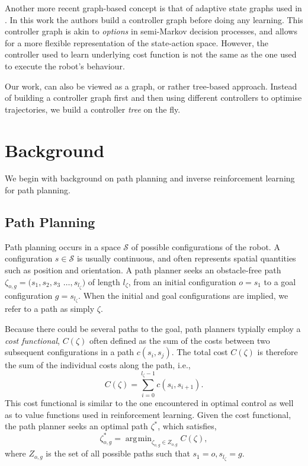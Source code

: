 \documentclass{article}  %
\DeclareMathOperator*{\argmin}{\arg\!\min}
\begin{document}
Another more recent graph-based concept is that of adaptive state graphs used in \cite{okallearning}. In this work the authors build a controller graph before doing any learning. This controller graph is akin to \emph{options} in semi-Markov decision processes, and allows for a more flexible representation of the state-action space. However, the controller used to learn underlying cost function is not the same as the one used to execute the robot's behaviour. 

Our work, can also be viewed as a graph, or rather tree-based approach. Instead of building a controller graph first and then using different controllers to optimise trajectories, we build a controller \emph{tree} on the fly.


\section{Background}
We begin with background on path planning and inverse reinforcement learning for path planning.

\subsection{Path Planning \label{subsec:path_planning}}
Path planning occurs in a space $\mathcal{S}$ of possible configurations of the robot. A configuration $s \in \mathcal{S}$ is usually continuous, and often represents spatial quantities such as position and orientation. A path planner seeks an obstacle-free path $\zeta_{o,g} = (s_1,s_2,s_3$ $\ldots,s_{l_{\zeta}}) $ of length $l_{\zeta}$, from an initial configuration $o = s_1$ to a goal configuration  $g =s_{l_{\zeta}}$. When the initial and goal configurations are implied, we refer to a path as simply $\zeta$.

Because there could be several paths to the goal, path planners typially employ a \emph{cost functional}, $C(\zeta)$ often defined as the sum of the costs between two subsequent configurations in a path $c(s_i,s_j)$. The total cost $C(\zeta)$ is therefore the sum of the individual costs along the path, i.e.,
\begin{equation}
	C(\zeta) = \sum_{i=0}^{l_{\zeta}-1} c(s_i,s_{i+1}).
\end{equation}
This cost functional is similar to the one encountered in optimal control as well as to value functions used in reinforcement learning. Given the cost functional, the path planner seeks an optimal path $\zeta^*$, which satisfies,
\begin{equation}
 	\zeta^*_{o,g} = \argmin_{\zeta_{o,g} \in Z_{o,g}} C(\zeta), \label{eq:back_plan}
\end{equation}
where $Z_{o,g}$ is the set of all possible paths such that $s_1 = o, s_{l_\zeta} = g$.
\end{document}
